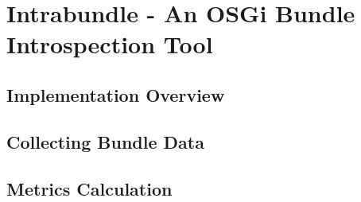 \chapter{Intrabundle - An OSGi Bundle Introspection Tool}

\section{Implementation Overview}

\section{Collecting Bundle Data}

\section{Metrics Calculation}

